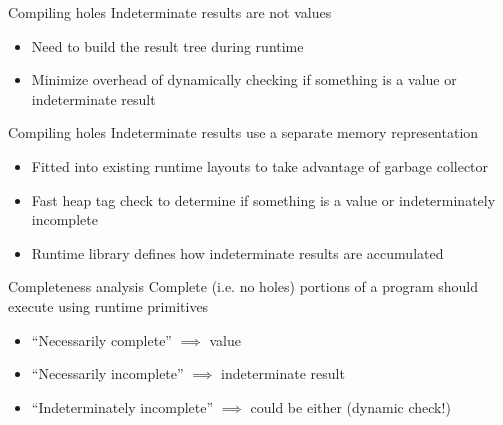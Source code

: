 \documentclass[xcolor={dvipsnames},xtable]{beamer}
\begin{document}
\renewcommand{\currenttitle}{Compiling holes}
\begin{frame}{\currenttitle}
  Indeterminate results are not values
  \begin{itemize}
    \item Need to build the result tree during runtime
    \item Minimize overhead of dynamically checking if something is a value or indeterminate result
  \end{itemize}
\end{frame}

\renewcommand{\currenttitle}{Compiling holes}
\begin{frame}{\currenttitle}
  Indeterminate results use a separate memory representation
  \begin{itemize}
    \item Fitted into existing runtime layouts to take advantage of garbage collector
    \item Fast heap tag check to determine if something is a value or indeterminately incomplete
    \item Runtime library defines how indeterminate results are accumulated
  \end{itemize}
\end{frame}

\renewcommand{\currenttitle}{Completeness analysis}
\begin{frame}{\currenttitle}
  Complete (i.e. no holes) portions of a program should execute using runtime primitives

  \begin{itemize}
    \item<+-> ``Necessarily complete'' $\implies$ value
    \item<+-> ``Necessarily incomplete'' $\implies$ indeterminate result
    \item<+-> ``Indeterminately incomplete'' $\implies$ could be either (dynamic check!)
  \end{itemize}

\end{frame}
\end{document}
